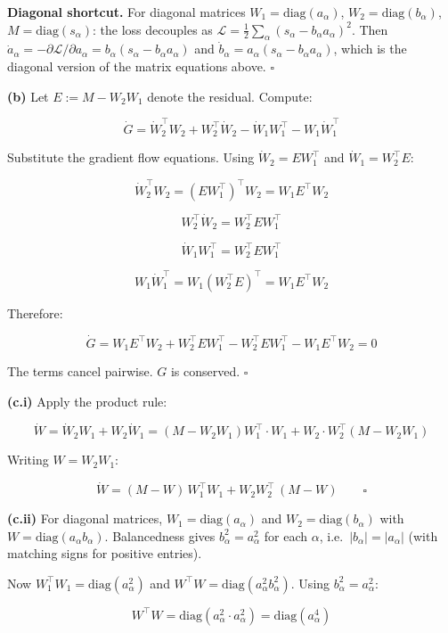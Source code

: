 \documentclass[
]{article}
\begin{document}
\textbf{Diagonal shortcut.} For diagonal matrices
\(W_1 = \text{diag}(a_\alpha)\), \(W_2 = \text{diag}(b_\alpha)\),
\(M = \text{diag}(s_\alpha)\): the loss decouples as
\(\mathcal{L} = \frac{1}{2}\sum_\alpha(s_\alpha - b_\alpha a_\alpha)^2\).
Then
\(\dot{a}_\alpha = -\partial\mathcal{L}/\partial a_\alpha = b_\alpha(s_\alpha - b_\alpha a_\alpha)\)
and \(\dot{b}_\alpha = a_\alpha(s_\alpha - b_\alpha a_\alpha)\), which
is the diagonal version of the matrix equations above. \(\square\)

\textbf{(b)} Let \(E := M - W_2 W_1\) denote the residual. Compute:

\[\dot{G} = \dot{W}_2^\top W_2 + W_2^\top \dot{W}_2 - \dot{W}_1 W_1^\top - W_1 \dot{W}_1^\top\]

Substitute the gradient flow equations. Using \(\dot{W}_2 = E W_1^\top\)
and \(\dot{W}_1 = W_2^\top E\):

\[\dot{W}_2^\top W_2 = (E W_1^\top)^\top W_2 = W_1 E^\top W_2\]

\[W_2^\top \dot{W}_2 = W_2^\top E W_1^\top\]

\[\dot{W}_1 W_1^\top = W_2^\top E W_1^\top\]

\[W_1 \dot{W}_1^\top = W_1(W_2^\top E)^\top = W_1 E^\top W_2\]

Therefore:

\[\dot{G} = W_1 E^\top W_2 + W_2^\top E W_1^\top - W_2^\top E W_1^\top - W_1 E^\top W_2 = 0\]

The terms cancel pairwise. \(G\) is conserved. \(\square\)

\textbf{(c.i)} Apply the product rule:

\[\dot{W} = \dot{W}_2 W_1 + W_2 \dot{W}_1 = (M - W_2 W_1)W_1^\top \cdot W_1 + W_2 \cdot W_2^\top(M - W_2 W_1)\]

Writing \(W = W_2 W_1\):

\[\dot{W} = (M - W)\,W_1^\top W_1 + W_2 W_2^\top\,(M - W) \qquad \square\]

\textbf{(c.ii)} For diagonal matrices, \(W_1 = \text{diag}(a_\alpha)\)
and \(W_2 = \text{diag}(b_\alpha)\) with
\(W = \text{diag}(a_\alpha b_\alpha)\). Balancedness gives
\(b_\alpha^2 = a_\alpha^2\) for each \(\alpha\),
i.e.~\(|b_\alpha| = |a_\alpha|\) (with matching signs for positive
entries).

Now \(W_1^\top W_1 = \text{diag}(a_\alpha^2)\) and
\(W^\top W = \text{diag}(a_\alpha^2 b_\alpha^2)\). Using
\(b_\alpha^2 = a_\alpha^2\):

\[W^\top W = \text{diag}(a_\alpha^2 \cdot a_\alpha^2) = \text{diag}(a_\alpha^4)\]
\end{document}
